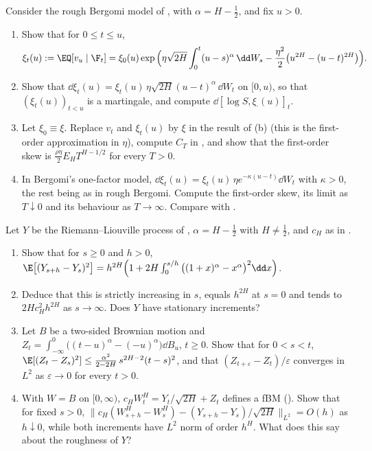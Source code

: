 \begin{exercise}\label{ex:rv-forward-variance}
\medium Consider the rough Bergomi model of , with $\alpha=H-\frac12$, and fix $u>0$.
\begin{enumerate}[label=(\alph*)]
  \item Show that for $0\le t\le u$,
    \[
      \xi_t(u):=\EQ[v_u\mid\F_t]=\xi_0(u)\exp\Big(\eta\sqrt{2H}\int_0^t(u-s)^\alpha\,\dd W_s
      -\frac{\eta^2}2\big(u^{2H}-(u-t)^{2H}\big)\Big).
    \]
  \item Show that $\dd\xi_t(u)=\xi_t(u)\,\eta\sqrt{2H}(u-t)^\alpha\,\dd W_t$ on $[0,u)$, so that $(\xi_t(u))_{t<u}$ is a
    martingale, and compute $\dd[\log S,\xi_\cdot(u)]_t$.
  \item Let $\xi_0\equiv\xi$. Replace $v_t$ and $\xi_t(u)$ by $\xi$ in the result of (b) (this is the first-order
    approximation in $\eta$), compute $C_T$ in , and show that the first-order skew is
    $\frac{\rho\eta}2E_HT^{H-1/2}$ for every $T>0$.
  \item In Bergomi's one-factor model, $\dd\xi_t(u)=\xi_t(u)\,\eta e^{-\kappa(u-t)}\dd W_t$ with $\kappa>0$, the rest being
    as in rough Bergomi. Compute the first-order skew, its limit as $T\downarrow0$ and its behaviour as
    $T\to\infty$. Compare with .
\end{enumerate}
\end{exercise}

\begin{exercise}\label{ex:rv-rl-increments}
\hard Let $Y$ be the Riemann--Liouville process of , $\alpha=H-\frac12$ with $H\ne\frac12$, and
$c_H$ as in .
\begin{enumerate}[label=(\alph*)]
  \item Show that for $s\ge0$ and $h>0$,
    $\E\big[(Y_{s+h}-Y_s)^2\big]=h^{2H}\Big(1+2H\int_0^{s/h}\big((1+x)^\alpha-x^\alpha\big)^2\dd x\Big)$.
  \item Deduce that this is strictly increasing in $s$, equals $h^{2H}$ at $s=0$ and tends to $2Hc_H^2h^{2H}$ as
    $s\to\infty$. Does $Y$ have stationary increments?
  \item Let $B$ be a two-sided Brownian motion and $Z_t=\int_{-\infty}^0\big((t-u)^\alpha-(-u)^\alpha\big)\dd B_u$, $t\ge0$.
    Show that for $0<s<t$, $\E[(Z_t-Z_s)^2]\le\frac{\alpha^2}{2-2H}\,s^{2H-2}(t-s)^2$, and that
    $(Z_{t+\varepsilon}-Z_t)/\varepsilon$ converges in $L^2$ as $\varepsilon\to0$ for every $t>0$.
  \item With $W=B$ on $[0,\infty)$, $c_HW^H_t=Y_t/\sqrt{2H}+Z_t$ defines a fBM (). Show that
    for fixed $s>0$, $\big\|c_H(W^H_{s+h}-W^H_s)-(Y_{s+h}-Y_s)/\sqrt{2H}\big\|_{L^2}=O(h)$ as $h\downarrow0$, while both
    increments have $L^2$ norm of order $h^H$. What does this say about the roughness of $Y$?
\end{enumerate}
\end{exercise}

